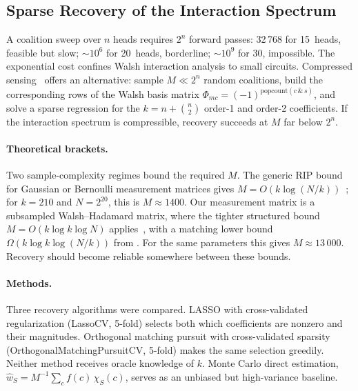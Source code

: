 \documentclass{article}
\begin{document}
\subsection{Sparse Recovery of the Interaction Spectrum}
\label{sec:sparse-walsh-recovery}

A coalition sweep over $n$ heads requires $2^n$ forward passes: 32\,768
for 15~heads, feasible but slow; ${\sim}10^6$ for 20~heads, borderline;
${\sim}10^9$ for 30, impossible. The exponential cost confines Walsh
interaction analysis to small circuits.  Compressed
sensing~\citep{candes2005decoding} offers an alternative: sample $M \ll 2^n$
random coalitions, build the corresponding rows of the Walsh basis matrix
$\Phi_{mc} = (-1)^{\mathrm{popcount}(c \,\&\, s)}$, and solve a sparse
regression for the $k = n + \binom{n}{2}$ order-1 and order-2 coefficients.
If the interaction spectrum is compressible, recovery succeeds at $M$
far below $2^n$.

\paragraph{Theoretical brackets.}

Two sample-complexity regimes bound the required $M$. The generic RIP
bound for Gaussian or Bernoulli measurement matrices gives
$M = O(k \log(N/k))$~\citep{candes2005decoding}; for $k=210$ and
$N = 2^{20}$, this is $M \approx 1400$. Our measurement matrix is a
subsampled Walsh--Hadamard matrix, where the tighter structured bound
$M = O(k \log k \log N)$ applies~\citep{bourgain2014,rudelson2008sparse},
with a matching lower bound $\Omega(k \log k \log(N/k))$ from
\citet{blasiok2019sparse}. For the same parameters this gives $M \approx 13\,000$.
Recovery should become reliable somewhere between these bounds.

\paragraph{Methods.}

Three recovery algorithms were compared. LASSO with cross-validated
regularization (LassoCV, 5-fold) selects both which coefficients are nonzero
and their magnitudes. Orthogonal matching pursuit with cross-validated
sparsity (OrthogonalMatchingPursuitCV, 5-fold) makes the same selection
greedily. Neither method receives oracle knowledge of $k$. Monte Carlo
direct estimation, $\hat{w}_S = M^{-1} \sum_c f(c)\, \chi_S(c)$, serves as
an unbiased but high-variance baseline.
\end{document}
